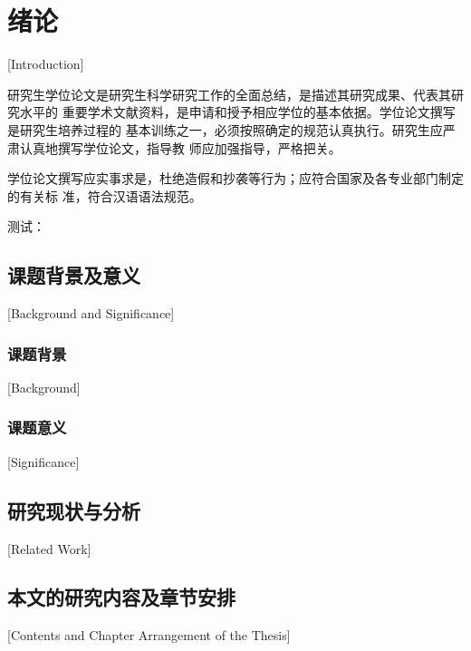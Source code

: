 
\chapter[绪论]{绪论}[Introduction]

研究生学位论文是研究生科学研究工作的全面总结，是描述其研究成果、代表其研究水平的
重要学术文献资料，是申请和授予相应学位的基本依据。学位论文撰写是研究生培养过程的
基本训练之一，必须按照确定的规范认真执行。研究生应严肃认真地撰写学位论文，指导教
师应加强指导，严格把关。

学位论文撰写应实事求是，杜绝造假和抄袭等行为；应符合国家及各专业部门制定的有关标
准，符合汉语语法规范。

测试：\cite{cnproceed}

\section{课题背景及意义}[Background and Significance]

\subsection{课题背景}[Background]

\subsection{课题意义}[Significance]


\section{研究现状与分析}[Related Work]


\section{本文的研究内容及章节安排}[Contents and Chapter Arrangement of the Thesis]



